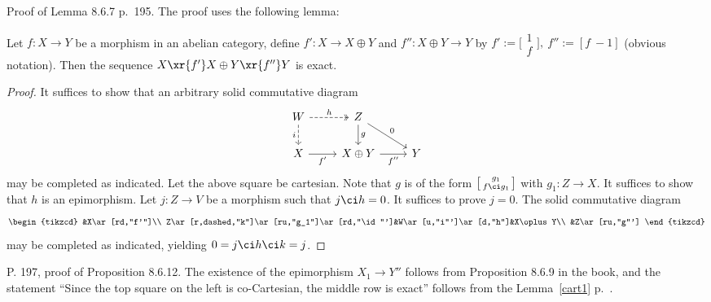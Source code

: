 \documentclass[12pt]{article}
\theoremstyle{remark}
\theoremstyle{definition}
\begin{document}
%

\begin{s} 
Proof of Lemma 8.6.7 p.~195. The proof uses the following lemma: 

\begin{lem} 
Let $f:X\to Y$ be a morphism in an abelian category, define $f':X\to X\oplus Y$ and $f'':X\oplus Y\to Y$ by $f':=\bigl[\begin{smallmatrix}1\\ f\end{smallmatrix}\bigr],\ f'':=[f\ -1]$ (obvious notation). Then the sequence $X\xr{f'}X\oplus Y\xr{f''}Y$ is exact. 
\end{lem} 

\begin{proof} 
It suffices to show that an arbitrary solid commutative diagram 
$$
\begin{tikzcd}
W\ar[dashed]{d}[swap]{i}\ar[dashed, two heads]{r}{h}&Z\ar{dr}{0}\ar{d}{g}\\ 
X\ar{r}[swap]{f'}&X\oplus Y\ar{r}[swap]{f''}&Y
\end{tikzcd}
$$ 
may be completed as indicated. Let the above square be cartesian. Note that $g$ is of the form $\bigl[\begin{smallmatrix}g_1\\ f\ci g_1\end{smallmatrix}\bigr]$ with $g_1:Z\to X$. It suffices to show that $h$ is an epimorphism. Let $j:Z\to V$ be a morphism such that $j\ci h=0$. It suffices to prove $j=0$. The solid commutative diagram 
$$
\begin{tikzcd}
&X\ar[rd,"f'"]\\ 
Z\ar[r,dashed,"k"]\ar[ru,"g_1"]\ar[rd,"\id"']&W\ar[u,"i"']\ar[d,"h"]&X\oplus Y\\ 
&Z\ar[ru,"g"']
\end{tikzcd}
$$ 
may be completed as indicated, yielding $0=j\ci h\ci k=j$. 
\end{proof} 
\end{s} 

%

\begin{s} 
P. 197, proof of Proposition 8.6.12. The existence of the epimorphism $X_1\to Y''$ follows from Proposition 8.6.9 in the book, and the statement ``Since the top square on the left is co-Cartesian, the middle row is exact'' follows from the Lemma~\ref{cart1} p.~.
\end{s}
\end{document}
